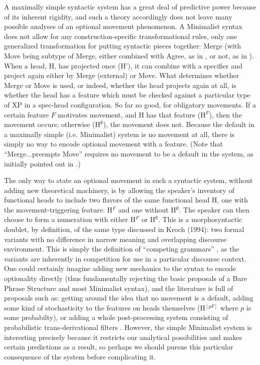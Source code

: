 A maximally simple syntactic system has a great deal of predictive power because of its inherent rigidity, and such a theory accordingly does not leave many possible analyses of an optional movement phenomenon.
A Minimalist syntax does not allow for any construction-specific transformational rules, only one generalized transformation for putting syntactic pieces together: Merge (with Move being subtype of Merge, either combined with Agree, as in \citealt{chomsky2000}, or not, as in \citealt{chomsky2004, chomsky2008}).
When a head, H, has projected once (H'), it can combine with a specifier and project again either by Merge (external) or Move.
What determines whether Merge or Move is used, or indeed, whether the head projects again at all, is whether the head has a feature which must be checked against a particular type of XP in a spec-head configuration.
So far so good, for obligatory movements.
If a certain feature $F$ motivates movement, and H has that feature (H$^F$), then the movement occurs; otherwise (H$^\emptyset$), the movement does not.
Because the default in a maximally simple (i.e. Minimalist) system is no movement at all, there is simply no way to encode optional movement with a feature.
(Note that ``Merge...preempts Move'' requires no movement to be a default in the system, as initially pointed out in \citealt{chomsky2000}.)

The only way to state an optional movement in such a syntactic system, without adding new theoretical machinery, is by allowing the speaker's inventory of functional heads to include two flavors of the same functional head H, one with the movement-triggering feature: H$^F$ and one without H$^\emptyset$.
The speaker can then choose to form a numeration with either H$^F$ or H$^\emptyset$.
This is a morphosyntactic doublet, by definition, of the same type discussed in Kroch (1994): two formal variants with no difference in narrow meaning and overlapping discourse environment.
This is simply the definition of ``competing grammars'' \citep{kroch1994}, as the variants are inherently in competition for use in a particular discourse context.
One could certainly imagine adding new mechanics to the syntax to encode optionality directly (thus fundamentally rejecting the basic proposals of a Bare Phrase Structure \citep{chomsky1995} and most Minimalist syntax), and the literature is full of proposals such as: getting around the idea that no movement is a default, adding some kind of stochasticity to the features on heads themselves (H$^{[pF]}$ where $p$ is some probabilty), or adding a whole post-processing system consisting of probabilistic trans-derivational filters .
However, the simple Minimalist system is interesting precisely because it restricts our analytical possibilities and makes certain predictions as a result, so perhaps we should pursue this particular consequence of the system before complicating it.

